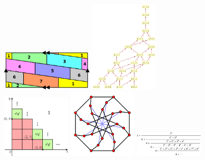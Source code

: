 \documentclass{deliverablereport}
\begin{document}
\begin{figure}
\begin{center}
    \hfil
    \includegraphics[width=0.4\textwidth]{images/500px-Torus_with_seven_colours}
    \includegraphics[width=0.3\textwidth]{images/359px-F4HassePoset}
    \hfil
    \includegraphics[width=0.3\textwidth]{images/Wikipic}
    \hfil
    \includegraphics[width=0.3\textwidth]{images/500px-McGee_graph}
    \includegraphics[width=0.3\textwidth]{images/fractioncont}

\end{center}
\end{figure}
\end{document}
